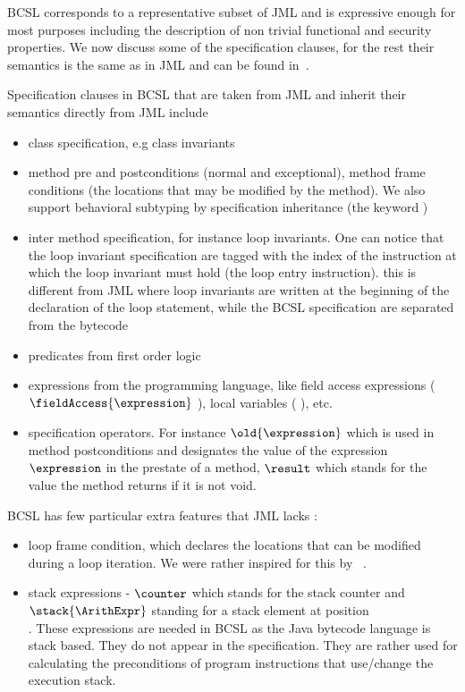 BCSL corresponds to a representative subset of JML and is expressive enough for most purposes including the description of non trivial functional and 
 security properties. We now discuss some of the specification clauses, for the rest their semantics is the same as in JML and can be found in~\cite{RT03djml,JMLRefMan}.

 Specification clauses in BCSL that are taken from JML and inherit their semantics directly from JML include
\begin{itemize}
   \item class specification, e.g class invariants
   \item  method pre and postconditions (normal and exceptional), method frame conditions (the locations that may be modified by the method). 
     We also support behavioral subtyping by specification inheritance (the keyword )
   \item inter method specification, for instance loop invariants. One can notice that the loop invariant specification are tagged with the index of the instruction at which the loop invariant must hold (the loop entry instruction). this is different from  JML
where loop invariants are written at the beginning of the declaration of the loop statement, while the BCSL specification are separated
from the bytecode
   \item predicates from first order logic   
      
\item expressions from the programming language, like field access expressions ($\fieldAccess{\expression}$ ), local variables (  ), etc.
\item specification operators. For instance  $\old{\expression}$ which is used in method postconditions and
 designates the value of the expression $\expression$ in the prestate of a method, $ \result$ which stands for the value the method
returns if it is not void.  
\end{itemize}

BCSL has few particular extra features that JML lacks :
\begin{itemize}
   \item loop frame condition, which declares the locations
that can be modified during a loop iteration. We were rather inspired for this by ~\cite{BRL-JACK}. 

   \item stack expressions - $\counter$ which stands for the stack counter and \\
 $\stack{\ArithExpr}$ standing for a stack element at position \\
\ArithExpr. These expressions are needed in BCSL as the Java bytecode language is
stack based.  They do not appear in the specification. They are rather used for calculating the preconditions of program 
instructions that use/change the execution stack. 
\end{itemize}



